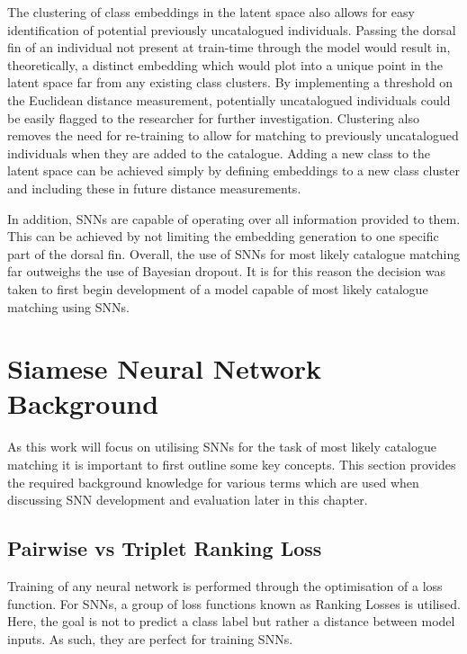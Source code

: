 The clustering of class embeddings in the latent space also allows for easy identification of potential previously uncatalogued individuals. Passing the dorsal fin of an individual not present at train-time through the model would result in, theoretically, a distinct embedding which would plot into a unique point in the latent space far from any existing class clusters. By implementing a threshold on the Euclidean distance measurement, potentially uncatalogued individuals could be easily flagged to the researcher for further investigation. Clustering also removes the need for re-training to allow for matching to previously uncatalogued individuals when they are added to the catalogue. Adding a new class to the latent space can be achieved simply by defining embeddings to a new class cluster and including these in future distance measurements.

In addition, SNNs are capable of operating over all information provided to them. This can be achieved by not limiting the embedding generation to one specific part of the dorsal fin. Overall, the use of SNNs for most likely catalogue matching far outweighs the use of Bayesian dropout. It is for this reason the decision was taken to first begin development of a model capable of most likely catalogue matching using SNNs.

\section{Siamese Neural Network Background}\label{ch:ID,sec:SNNBackground}

As this work will focus on utilising SNNs for the task of most likely catalogue matching it is important to first outline some key concepts. This section provides the required background knowledge for various terms which are used when discussing SNN development and evaluation later in this chapter.

\subsection{Pairwise vs Triplet Ranking Loss}\label{ch:ID,sec:SNNBackground,sub:lossFunction}

Training of any neural network is performed through the optimisation of a loss function. For SNNs, a group of loss functions known as Ranking Losses is utilised. Here, the goal is not to predict a class label but rather a distance between model inputs. As such, they are perfect for training SNNs. 

